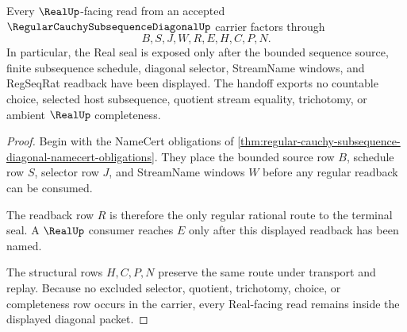 \begin{theorem}
\label{thm:regular-cauchy-subsequence-diagonal-real-handoff}
Every $\RealUp$-facing read from an accepted $\RegularCauchySubsequenceDiagonalUp$ carrier factors through
$$
B,S,J,W,R,E,H,C,P,N .
$$
In particular, the Real seal is exposed only after the bounded sequence source, finite subsequence schedule, diagonal selector, StreamName windows, and RegSeqRat readback have been displayed. The handoff exports no countable choice, selected host subsequence, quotient stream equality, trichotomy, or ambient $\RealUp$ completeness.
\end{theorem}
\begin{proof}
Begin with the NameCert obligations of \autoref{thm:regular-cauchy-subsequence-diagonal-namecert-obligations}. They place the bounded source row $B$, schedule row $S$, selector row $J$, and StreamName windows $W$ before any regular readback can be consumed.

The readback row $R$ is therefore the only regular rational route to the terminal seal. A $\RealUp$ consumer reaches $E$ only after this displayed readback has been named.

The structural rows $H,C,P,N$ preserve the same route under transport and replay. Because no excluded selector, quotient, trichotomy, choice, or completeness row occurs in the carrier, every Real-facing read remains inside the displayed diagonal packet.
\end{proof}


\begin{closurestatus}{\RegularCauchySubsequenceDiagonalUp}
  \theoryclosure{\seedClosure}
  \formalstatus{\unformalizedV}
\end{closurestatus}
